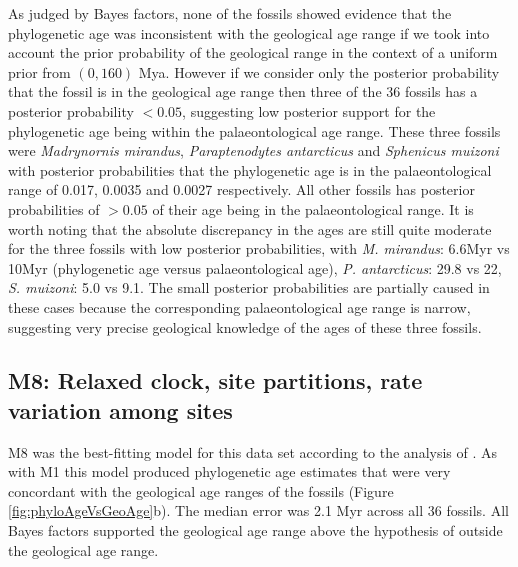 \documentclass[11pt]{article}
\newcommand{\Mstrict}{{M1}}
\newcommand{\Mrelaxed}{{M8}}
\begin{document}
As judged by Bayes factors, none of the fossils showed evidence that the phylogenetic age was inconsistent with the geological age range if we took into account the prior probability of the geological range in the context of a uniform prior from $(0,160)$ Mya. However if we consider only the posterior probability that the fossil is in the geological age range then three of the 36 fossils has a posterior probability $< 0.05$, suggesting low posterior support for the phylogenetic age being within the palaeontological age range. These three fossils were {\em Madrynornis mirandus}, {\em Paraptenodytes antarcticus} and {\em Sphenicus muizoni} with posterior probabilities that the phylogenetic age is in the palaeontological range of 0.017, 0.0035 and 0.0027 respectively. All other fossils has posterior probabilities of $> 0.05$ of their age being in the palaeontological range. It is worth noting that the absolute discrepancy in the ages are still quite moderate for the three fossils with low posterior probabilities, with {\em M. mirandus}: 6.6Myr vs 10Myr (phylogenetic age versus palaeontological age), {\em P. antarcticus}: 29.8 vs 22, {\em S. muizoni}: 5.0 vs 9.1. The small posterior probabilities are partially caused in these cases because the corresponding palaeontological age range is narrow, suggesting very precise geological knowledge of the ages of these three fossils.

\subsection*{\Mrelaxed{}: Relaxed clock, site partitions, rate variation among sites}

\Mrelaxed{} was the best-fitting model for this data set according to the analysis of \textcite{gavryushkina2015bayesian}. As with \Mstrict{} this model produced phylogenetic age estimates that were very concordant with the geological age ranges of the fossils (Figure \ref{fig:phyloAgeVsGeoAge}b). The median error was 2.1 Myr across all 36 fossils. All Bayes factors supported the geological age range above the hypothesis of outside the geological age range.
\end{document}
